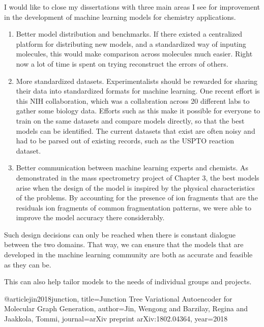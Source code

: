 I would like to close my dissertations with three main areas I see for improvement in the development of machine learning models for chemistry applications.

\begin{enumerate}

\item Better model distribution and benchmarks. If there existed a centralized platform for distributing new models, and a standardized way of inputing molecules, this would make comparison across molecules much easier. Right now a lot of time is spent on trying reconstruct the errors of others.

\item More standardized datasets. Experimentalists should be rewarded for sharing their data into standardized formats for machine learning. One recent effort is this NIH collaboration, which was a collabration across 20 different labs to gather some biology data. Efforts such as this make it possible for everyone to train on the same datasets and compare models directly, so that the best models can be identified. The current datasets that exist are often noisy and had to be parsed out of existing records, such as the USPTO reaction dataset.

\item Better communication between machine learning experts and chemists. As demonstrated in the mass spectrometry project of Chapter 3, the best models arise when the design of the model is inspired by the physical characteristics of the problems. By accounting for the presence of ion fragments that are the residuals ion fragments of common fragmentation patterns, we were able to improve the model accuracy there considerably.

\end{enumerate}

Such design decisions can only be reached when there is constant dialogue between the two domains. That way, we can ensure that the models that are developed in the machine learning community are both as accurate and feasible as they can be.

This can also help tailor models to the needs of individual groups and projects.

@article{jin2018junction,
  title={Junction Tree Variational Autoencoder for Molecular Graph Generation},
  author={Jin, Wengong and Barzilay, Regina and Jaakkola, Tommi},
  journal={arXiv preprint arXiv:1802.04364},
  year={2018}
}

